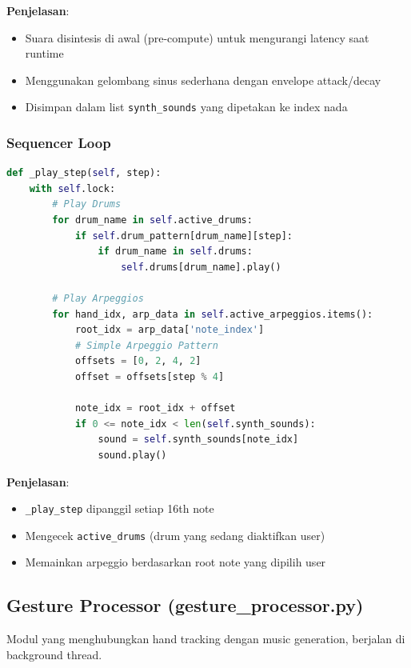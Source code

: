 \textbf{Penjelasan}:
\begin{itemize}
    \item Suara disintesis di awal (pre-compute) untuk mengurangi latency saat runtime
    \item Menggunakan gelombang sinus sederhana dengan envelope attack/decay
    \item Disimpan dalam list \texttt{synth\_sounds} yang dipetakan ke index nada
\end{itemize}

\subsubsection{Sequencer Loop}

\begin{lstlisting}[language=Python, caption=Loop utama sequencer]
def _play_step(self, step):
    with self.lock:
        # Play Drums
        for drum_name in self.active_drums:
            if self.drum_pattern[drum_name][step]:
                if drum_name in self.drums:
                    self.drums[drum_name].play()
        
        # Play Arpeggios
        for hand_idx, arp_data in self.active_arpeggios.items():
            root_idx = arp_data['note_index']
            # Simple Arpeggio Pattern
            offsets = [0, 2, 4, 2] 
            offset = offsets[step % 4]
            
            note_idx = root_idx + offset
            if 0 <= note_idx < len(self.synth_sounds):
                sound = self.synth_sounds[note_idx]
                sound.play()
\end{lstlisting}

\textbf{Penjelasan}:
\begin{itemize}
    \item \texttt{\_play\_step} dipanggil setiap 16th note
    \item Mengecek \texttt{active\_drums} (drum yang sedang diaktifkan user)
    \item Memainkan arpeggio berdasarkan root note yang dipilih user
\end{itemize}



\subsection{Gesture Processor (gesture\_processor.py)}

Modul yang menghubungkan hand tracking dengan music generation, berjalan di background thread.

